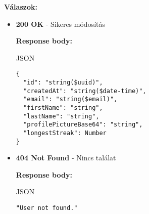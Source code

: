 \documentclass[12pt]{report}
\begin{document}
\begin{description}
    \vspace{0.5cm}
    \textbf{Válaszok:}
    \begin{itemize}
      \item \textbf{200 OK} - Sikeres módosítás

        \textbf{Response body:}
        \begin{codeblock}{JSON}
          \begin{verbatim}
{
  "id": "string($uuid)",
  "createdAt": "string($date-time)",
  "email": "string($email)",
  "firstName": "string",
  "lastName": "string",
  "profilePictureBase64": "string",
  "longestStreak": Number
}
          \end{verbatim}
        \end{codeblock}

      \item \textbf{404 Not Found} - Nincs találat

        \textbf{Response body:}
        \begin{codeblock}{JSON}
          \begin{verbatim}
"User not found."
          \end{verbatim}
        \end{codeblock}
    \end{itemize}

\end{description}
\end{document}
